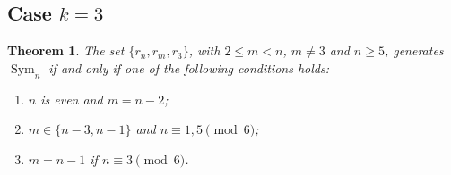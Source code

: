 \documentclass[
final
]{dmtcs-episciences}
\newtheorem{theorem}{Theorem}
\DeclareMathOperator{\Sym}{\mathrm{Sym}}
\begin{document}
\subsection{Case $k=3$}\label{k3}

\medskip

\begin{theorem}\label{thm:3}
The set $\{r_n,r_m,r_3\}$, with $2\leqslant m<n$, $m \not =3$ and $n\geqslant 5$, generates $\Sym_n$ if and only if one of the following conditions holds{\rm:}
    \begin{enumerate}[$(i)$]
        \item $n$ is even and $m=n-2${\rm;}
        \item $m\in\{n-3,n-1\}$ and $n\equiv 1,5\pmod 6${\rm;}
        \item $m=n-1$ if $n\equiv3\pmod 6$.
    \end{enumerate}
\end{theorem}
\end{document}
